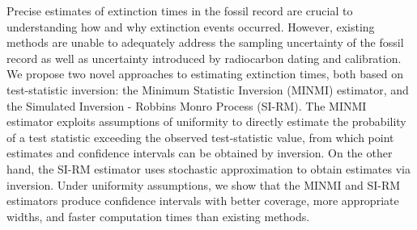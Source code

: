 

Precise estimates of extinction times in the fossil record are crucial to understanding how and why extinction events occurred. However, existing methods are unable to adequately address the sampling uncertainty of the fossil record as well as uncertainty introduced by radiocarbon dating and calibration. We propose two novel approaches to estimating extinction times, both based on test-statistic inversion: the Minimum Statistic Inversion (MINMI) estimator, and the Simulated Inversion - Robbins Monro Process (SI-RM). The MINMI estimator exploits assumptions of uniformity to directly estimate the probability of a test statistic exceeding the observed test-statistic value, from which point estimates and confidence intervals can be obtained by inversion. On the other hand, the SI-RM estimator uses stochastic approximation to obtain estimates via inversion. Under uniformity assumptions, we show that the MINMI and SI-RM estimators produce confidence intervals with better coverage, more appropriate widths, and faster computation times than existing methods.